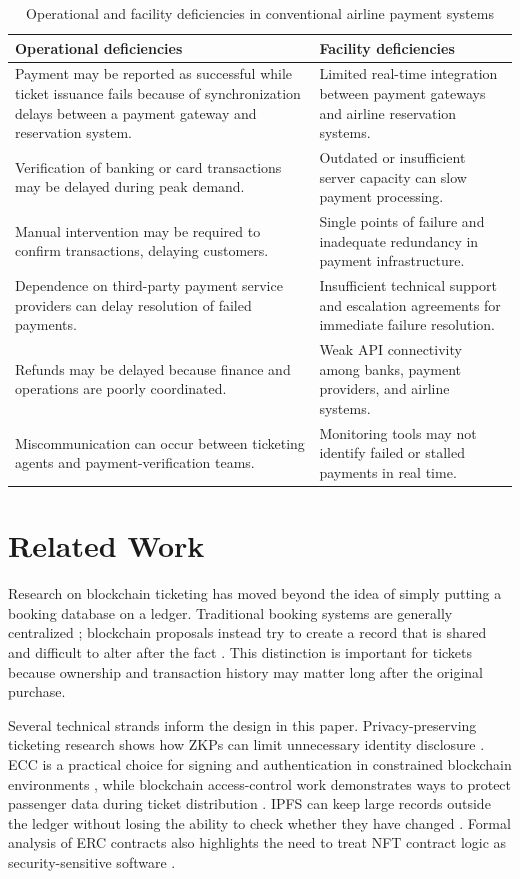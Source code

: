 \documentclass[conference]{IEEEtran}
\begin{document}
\begin{table}[!t]
\caption{Operational and facility deficiencies in conventional airline payment systems}
\label{tab:challenges}
\centering
\footnotesize
\begin{tabularx}{\textwidth}{YY}
\toprule
\textbf{Operational deficiencies} & \textbf{Facility deficiencies}\\
\midrule
Payment may be reported as successful while ticket issuance fails because of synchronization delays between a payment gateway and reservation system. & Limited real-time integration between payment gateways and airline reservation systems.\\
Verification of banking or card transactions may be delayed during peak demand. & Outdated or insufficient server capacity can slow payment processing.\\
Manual intervention may be required to confirm transactions, delaying customers. & Single points of failure and inadequate redundancy in payment infrastructure.\\
Dependence on third-party payment service providers can delay resolution of failed payments. & Insufficient technical support and escalation agreements for immediate failure resolution.\\
Refunds may be delayed because finance and operations are poorly coordinated. & Weak API connectivity among banks, payment providers, and airline systems.\\
Miscommunication can occur between ticketing agents and payment-verification teams. & Monitoring tools may not identify failed or stalled payments in real time.\\
\bottomrule
\end{tabularx}
\end{table}

\section{Related Work}
Research on blockchain ticketing has moved beyond the idea of simply putting a booking database on a ledger. Traditional booking systems are generally centralized \cite{shaikh2023}; blockchain proposals instead try to create a record that is shared and difficult to alter after the fact \cite{sahoo2023,aldweesh2023}. This distinction is important for tickets because ownership and transaction history may matter long after the original purchase.

Several technical strands inform the design in this paper. Privacy-preserving ticketing research shows how ZKPs can limit unnecessary identity disclosure \cite{cha2018}. ECC is a practical choice for signing and authentication in constrained blockchain environments \cite{rizwan2021}, while blockchain access-control work demonstrates ways to protect passenger data during ticket distribution \cite{zhang2022}. IPFS can keep large records outside the ledger without losing the ability to check whether they have changed \cite{pawar2022}. Formal analysis of ERC contracts also highlights the need to treat NFT contract logic as security-sensitive software \cite{fekih2023}.
\end{document}

